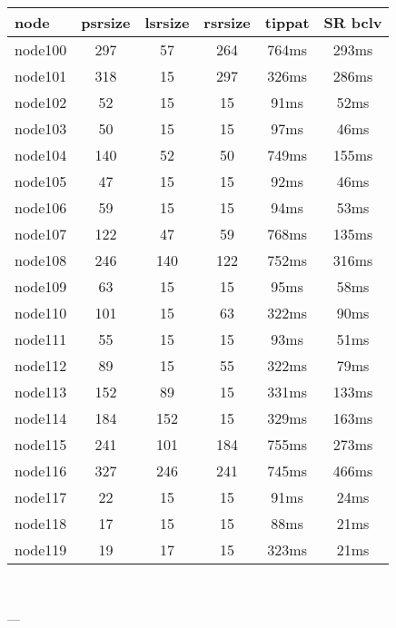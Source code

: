 \begin{tabular}{|l|c|c|c|c|c|}
\hline node & psrsize & lsrsize & rsrsize   & tippat & SR bclv\\
    \hline node100 & 297 & 57 & 264 & 764ms & 293ms\\
    \hline node101 & 318 & 15 & 297 & 326ms & 286ms\\
    \hline node102 & 52 & 15 & 15 & 91ms & 52ms\\
    \hline node103 & 50 & 15 & 15 & 97ms & 46ms\\
    \hline node104 & 140 & 52 & 50 & 749ms & 155ms\\
    \hline node105 & 47 & 15 & 15 & 92ms & 46ms\\
    \hline node106 & 59 & 15 & 15 & 94ms & 53ms\\
    \hline node107 & 122 & 47 & 59 & 768ms & 135ms\\
    \hline node108 & 246 & 140 & 122 & 752ms & 316ms\\
    \hline node109 & 63 & 15 & 15 & 95ms & 58ms\\
    \hline node110 & 101 & 15 & 63 & 322ms & 90ms\\
    \hline node111 & 55 & 15 & 15 & 93ms & 51ms\\
    \hline node112 & 89 & 15 & 55 & 322ms & 79ms\\
    \hline node113 & 152 & 89 & 15 & 331ms & 133ms\\
    \hline node114 & 184 & 152 & 15 & 329ms & 163ms\\
    \hline node115 & 241 & 101 & 184 & 755ms & 273ms\\
    \hline node116 & 327 & 246 & 241 & 745ms & 466ms\\
    \hline node117 & 22 & 15 & 15 & 91ms & 24ms\\
    \hline node118 & 17 & 15 & 15 & 88ms & 21ms\\
    \hline node119 & 19 & 17 & 15 & 323ms & 21ms\\

\hline
\end{tabular} \

---


